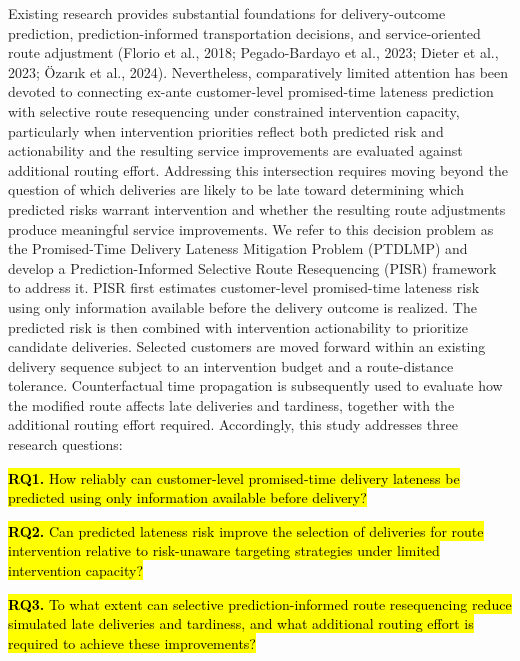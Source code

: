 \documentclass[
]{article}
\begin{document}
Existing research provides substantial foundations for delivery-outcome
prediction, prediction-informed transportation decisions, and
service-oriented route adjustment (Florio et al., 2018; Pegado-Bardayo
et al., 2023; Dieter et al., 2023; Özarık et al., 2024). Nevertheless,
comparatively limited attention has been devoted to connecting ex-ante
customer-level promised-time lateness prediction with selective route
resequencing under constrained intervention capacity, particularly when
intervention priorities reflect both predicted risk and actionability
and the resulting service improvements are evaluated against additional
routing effort. Addressing this intersection requires moving beyond the
question of which deliveries are likely to be late toward determining
which predicted risks warrant intervention and whether the resulting
route adjustments produce meaningful service improvements. We refer to
this decision problem as the Promised-Time Delivery Lateness Mitigation
Problem (PTDLMP) and develop a Prediction-Informed Selective Route
Resequencing (PISR) framework to address it. PISR first estimates
customer-level promised-time lateness risk using only information
available before the delivery outcome is realized. The predicted risk is
then combined with intervention actionability to prioritize candidate
deliveries. Selected customers are moved forward within an existing
delivery sequence subject to an intervention budget and a route-distance
tolerance. Counterfactual time propagation is subsequently used to
evaluate how the modified route affects late deliveries and tardiness,
together with the additional routing effort required. Accordingly, this
study addresses three research questions:

\hl{\textbf{RQ1.} How reliably can customer-level promised-time delivery
lateness be predicted using only information available before delivery?}

\hl{\textbf{RQ2.} Can predicted lateness risk improve the selection of
deliveries for route intervention relative to risk-unaware targeting
strategies under limited intervention capacity?}

\hl{\textbf{RQ3.} To what extent can selective prediction-informed route
resequencing reduce simulated late deliveries and tardiness, and what
additional routing effort is required to achieve these improvements?}
\end{document}
